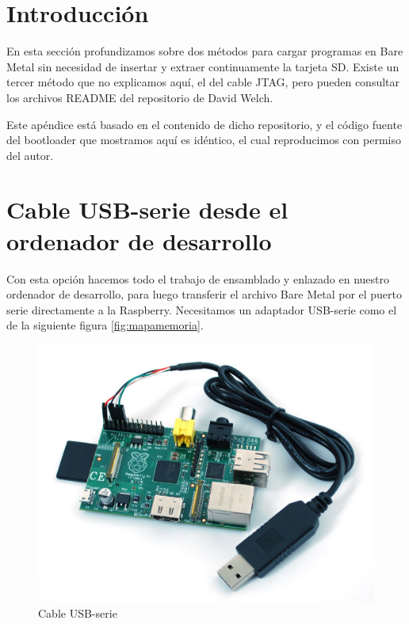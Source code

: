 \pagestyle{fancy}
\fancyhead[LE,RO]{\thepage}
\fancyhead[LO]{\nouppercase{\rightmark}}

\label{chp:SerieBoot}
\minitoc

\section{Introducción}

En esta sección profundizamos sobre dos métodos para cargar programas en Bare Metal sin
necesidad de insertar y extraer continuamente la tarjeta SD. Existe un tercer método que
no explicamos aquí, el del cable JTAG, pero pueden consultar los archivos
README del repositorio de David Welch\cite{DWEL}.

Este apéndice está basado en el contenido de dicho repositorio, y el código fuente del
bootloader que mostramos aquí es idéntico, el cual reproducimos con permiso del autor.

\section{Cable USB-serie desde el ordenador de desarrollo}

Con esta opción hacemos todo el trabajo de ensamblado y enlazado en nuestro ordenador
de desarrollo, para luego transferir el archivo Bare Metal por el puerto serie
directamente a la Raspberry. Necesitamos un adaptador USB-serie como el de la siguiente
figura \ref{fig:mapamemoria}.

\begin{figure}[h]
  \centering
    \includegraphics[width=14cm]{graphs/ARM_RaspberryPi_serial.jpg}
  \caption{Cable USB-serie}
  \label{fig:cableusb}
\end{figure}

